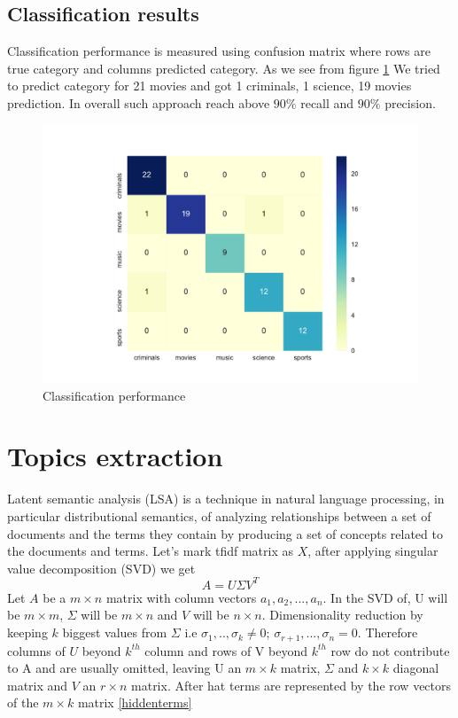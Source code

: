 \documentclass{article}
\begin{document}
\subsection{Classification results}
Classification performance is measured using confusion matrix where rows are true category and columns predicted category. As we see from figure \ref{confusion matrix} We tried to predict category for 21 movies and got 1 criminals, 1 science, 19 movies prediction. In overall such approach reach above $90 \%$  recall and $90 \%$ precision.
\begin{figure}[H]
  \includegraphics[width=\linewidth]{images/confussion_matrix.pdf}
  \caption{Classification performance}
  \label{confusion matrix}
\end{figure}

\section{Topics extraction}
Latent semantic analysis (LSA) is a technique in natural language processing, in particular distributional semantics, of analyzing relationships between a set of documents and the terms they contain by producing a set of concepts related to the documents and terms. Let's mark tfidf matrix as $X$, after applying singular value decomposition (SVD) we get 
\begin{equation}
\label{LSA}
A =U\Sigma V^T
\end{equation}
Let $A$ be a $m \times n$ matrix with column vectors $a_1, a_2, ..., a_n$. In the SVD of, U will be $m \times m$, $\Sigma$ will be $m \times n$ and $V$ will be $n \times n$. Dimensionality reduction by keeping  $k$ biggest  values from $\Sigma$ i.e $\sigma_1,..,\sigma_k \neq 0$; $\sigma_{r+1},...,\sigma_n = 0$. Therefore columns of $U$ beyond $k^{th}$ column and rows of V beyond $k^{th}$ row do not contribute to A and are usually omitted, leaving U an  $m \times k$ matrix, $\Sigma$ and  $k \times k$ diagonal matrix and $V$ an  $r \times n$ matrix. After hat terms are represented by the row vectors of the $m \times k$ matrix \ref{hiddenterms}
\end{document}
